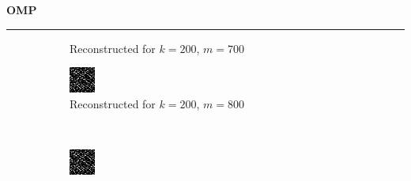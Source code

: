 \documentclass[a4paper,12pt]{article}
\newenvironment{solution}[2][]{%
    \begin{mdframed}[linecolor=blue!70!black, linewidth=2pt, roundcorner=10pt, backgroundcolor=yellow!10!white, skipabove=12pt, skipbelow=12pt]%
        \textbf{\large #2}
        \par\noindent\rule{\textwidth}{0.4pt}
}{
    \end{mdframed}
}
\begin{document}
\begin{solution}{OMP}
\begin{figure}[H]
\begin{subfigure}[t]{0.23\textwidth}
        \caption{Reconstructed for $k = 200$, $m = 700$}
    \end{subfigure}
    \begin{subfigure}[t]{0.23\textwidth}
        \centering
        \includegraphics[width=\textwidth]{../images/omp/Reconstructed_k_200_m_800.png}
        \caption{Reconstructed for $k = 200$, $m = 800$}
    \end{subfigure}\\
    \begin{subfigure}[t]{0.23\textwidth}
        \centering
        \includegraphics[width=\textwidth]{../images/omp/Reconstructed_k_200_m_900.png}

\end{subfigure}
\end{figure}
\end{solution}
\end{document}
